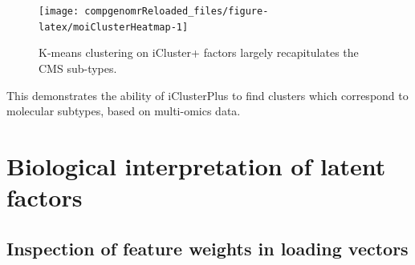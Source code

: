 \documentclass[12pt,]{krantz}
\newenvironment{Shaded}{\begin{snugshade}}{\end{snugshade}}
\newcommand{\DataTypeTok}[1]{\textcolor[rgb]{0.13,0.29,0.53}{#1}}
\newcommand{\DecValTok}[1]{\textcolor[rgb]{0.00,0.00,0.81}{#1}}
\newcommand{\KeywordTok}[1]{\textcolor[rgb]{0.13,0.29,0.53}{\textbf{#1}}}
\newcommand{\NormalTok}[1]{#1}
\newcommand{\OperatorTok}[1]{\textcolor[rgb]{0.81,0.36,0.00}{\textbf{#1}}}
\newcommand{\OtherTok}[1]{\textcolor[rgb]{0.56,0.35,0.01}{#1}}
\newcommand{\StringTok}[1]{\textcolor[rgb]{0.31,0.60,0.02}{#1}}
\begin{document}
\begin{Shaded}
\end{Shaded}

\begin{figure}

{\centering \texttt{[image: compgenomrReloaded\_files/figure-latex/moiClusterHeatmap-1]} 

}

\caption{K-means clustering on iCluster+ factors largely recapitulates the CMS sub-types.}\label{fig:moiClusterHeatmap}
\end{figure}

This demonstrates the ability of iClusterPlus to find clusters which correspond to molecular subtypes, based on multi-omics data.

\hypertarget{biological-interpretation-of-latent-factors}{%
\section{Biological interpretation of latent factors}\label{biological-interpretation-of-latent-factors}}

\hypertarget{inspection-of-feature-weights-in-loading-vectors}{%
\subsection{Inspection of feature weights in loading vectors}\label{inspection-of-feature-weights-in-loading-vectors}}
\end{document}

